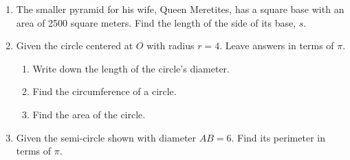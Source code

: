 \begin{enumerate}
\item The smaller pyramid for his wife, Queen Meretites, has a square base with an area of 2500 square meters. Find the length of the side of its base, $s$.

\newpage
\item Given the circle centered at $O$ with radius $r=4$. Leave answers in terms of $\pi$.
  \begin{multicols}{2}
    \begin{enumerate}
      \item Write down the length of the circle's diameter.
      \item Find the circumference of a circle. \vspace{1cm}
      \item Find the area of the circle.\vspace{1cm}
    \end{enumerate}
    \columnbreak
    \begin{flushright}
  \end{flushright}
  \end{multicols} \vspace{1cm}

  \item Given the semi-circle shown with diameter $AB=6$. Find its perimeter in terms of $\pi$.
    \begin{flushright}
  \end{flushright} \vspace{2cm}


\end{enumerate}
